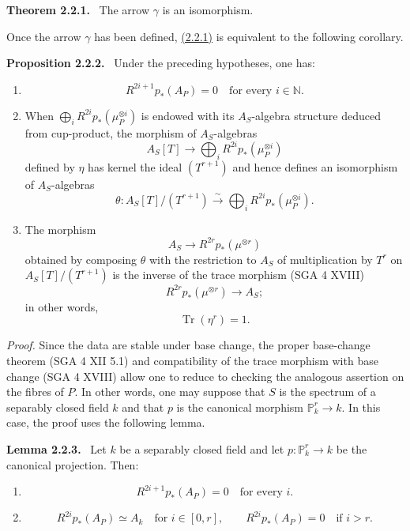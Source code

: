 \documentclass[11pt]{article}
\newenvironment{statement}[1]{\par\medskip\noindent\textbf{#1.}\ }{\par\medskip}
\begin{document}
\label{sga5:VII:theorem:2.2.1}\begin{statement}{Theorem 2.2.1}
The arrow $\gamma$ is an isomorphism.
\end{statement}

Once the arrow $\gamma$ has been defined, \hyperref[sga5:VII:theorem:2.2.1]{(2.2.1)} is equivalent to the following corollary.

\label{sga5:VII:proposition:2.2.2}\begin{statement}{Proposition 2.2.2}
Under the preceding hypotheses, one has:
\begin{enumerate}[label=\alph*)]
\item
\[
R^{2i+1}p_*(A_P)=0\quad\text{for every }i\in\mathbb N.
\]
\item When $\bigoplus_i R^{2i}p_*(\mu_P^{\otimes i})$ is endowed with its $A_S$-algebra structure deduced from cup-product, the morphism of $A_S$-algebras
\[
A_S[T]\longrightarrow \bigoplus_i R^{2i}p_*(\mu_P^{\otimes i})
\]
defined by $\eta$ has kernel the ideal $(T^{r+1})$ and hence defines an isomorphism of $A_S$-algebras
\[
\theta:A_S[T]/(T^{r+1})\xrightarrow{\sim}\bigoplus_i R^{2i}p_*(\mu_P^{\otimes i}).
\]
\item The morphism
\[
A_S\longrightarrow R^{2r}p_*(\mu^{\otimes r})
\]
obtained by composing $\theta$ with the restriction to $A_S$ of multiplication by $T^r$ on $A_S[T]/(T^{r+1})$ is the inverse of the trace morphism (SGA 4 XVIII)
\[
R^{2r}p_*(\mu^{\otimes r})\longrightarrow A_S;
\]
in other words,
\[
\operatorname{Tr}(\eta^r)=1.
\]
\end{enumerate}
\end{statement}

\emph{Proof.} Since the data are stable under base change, the proper base-change theorem (SGA 4 XII 5.1) and compatibility of the trace morphism with base change (SGA 4 XVIII) allow one to reduce to checking the analogous assertion on the fibres of $P$. In other words, one may suppose that $S$ is the spectrum of a separably closed field $k$ and that $p$ is the canonical morphism $\mathbb P^r_k\to k$. In this case, the proof uses the following lemma.

\label{sga5:VII:lemma:2.2.3}\begin{statement}{Lemma 2.2.3}
Let $k$ be a separably closed field and let $p:\mathbb P_k^r\to k$ be the canonical projection. Then:
\begin{enumerate}[label=\alph*)]
\item
\[
R^{2i+1}p_*(A_P)=0\quad\text{for every }i.
\]
\item
\[
R^{2i}p_*(A_P)\simeq A_k\quad\text{for }i\in[0,r],
\qquad
R^{2i}p_*(A_P)=0\quad\text{if }i>r.
\]
\end{enumerate}
\end{statement}
\end{document}
